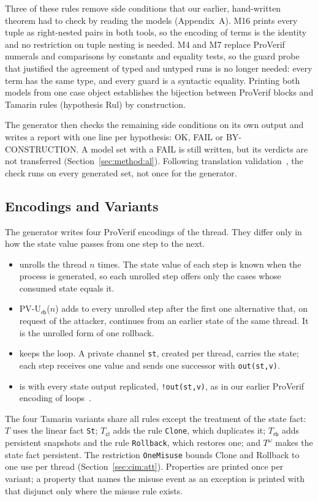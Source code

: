 Three of these rules remove side conditions that our earlier, hand-written theorem had to check by reading the models (Appendix~A). M16 prints every tuple as right-nested pairs in both tools, so the encoding of terms is the identity and no restriction on tuple nesting is needed. M4 and M7 replace ProVerif numerals and comparisons by constants and equality tests, so the guard probe that justified the agreement of typed and untyped runs is no longer needed: every term has the same type, and every guard is a syntactic equality. Printing both models from one case object establishes the bijection between ProVerif blocks and Tamarin rules (hypothesis Rul) by construction.

The generator then checks the remaining side conditions on its own output and writes a report with one line per hypothesis: OK, FAIL or BY-CONSTRUCTION. A model set with a FAIL is still written, but its verdicts are not transferred (Section~\ref{sec:method:al}). Following translation validation~\cite{Pnueli1998TV}, the check runs on every generated set, not once for the generator.

\subsection{Encodings and Variants}\label{sec:method:enc}

The generator writes four ProVerif encodings of the thread. They differ only in how the state value passes from one step to the next.
\begin{itemize}
\item {} unrolls the thread $n$ times. The state value of each step is known when the process is generated, so each unrolled step offers only the cases whose consumed state equals it.
\item \textsf{PV-U}$_{\mathsf{rb}}$($n$) adds to every unrolled step after the first one alternative that, on request of the attacker, continues from an earlier state of the same thread. It is the unrolled form of one rollback.
\item \PVlin keeps the loop. A private channel \texttt{st}, created per thread, carries the state; each step receives one value and sends one successor with \texttt{out(st,v)}.
\item \PVrep is \PVlin with every state output replicated, \texttt{!out(st,v)}, as in our earlier ProVerif encoding of loops~\cite{Mieno2024Access}.
\end{itemize}
The four Tamarin variants share all rules except the treatment of the state fact: $T$ uses the linear fact \texttt{St}; $T_{\mathsf{cl}}$ adds the rule \texttt{Clone}, which duplicates it; $T_{\mathsf{rb}}$ adds persistent snapshots and the rule \texttt{Rollback}, which restores one; and $T^{\omega}$ makes the state fact persistent. The restriction \texttt{OneMisuse} bounds Clone and Rollback to one use per thread (Section~\ref{sec:cim:att}). Properties are printed once per variant; a property that names the misuse event as an exception is printed with that disjunct only where the misuse rule exists.

